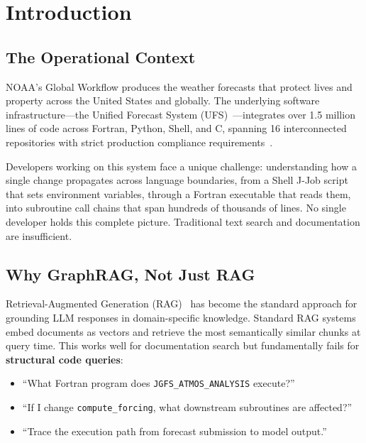 \documentclass[11pt,letterpaper]{article}
\begin{document}
\tableofcontents
\newpage

\section{Introduction}
\label{sec:intro}

\subsection{The Operational Context}

NOAA's Global Workflow produces the weather forecasts that protect lives
and property across the United States and globally. The underlying
software infrastructure---the Unified Forecast System
(UFS)~\cite{ufs2024}---integrates over 1.5 million lines of code across
Fortran, Python, Shell, and C, spanning 16 interconnected repositories
with strict production compliance
requirements~\cite{noaa2025ee2,globalworkflow2025}.

Developers working on this system face a unique challenge: understanding
how a single change propagates across language boundaries, from a Shell
J-Job script that sets environment variables, through a Fortran executable
that reads them, into subroutine call chains that span hundreds of
thousands of lines. No single developer holds this complete picture.
Traditional text search and documentation are insufficient.

\subsection{Why GraphRAG, Not Just RAG}

Retrieval-Augmented Generation (RAG)~\cite{lewis2020rag} has become the
standard approach for grounding LLM responses in domain-specific
knowledge. Standard RAG systems embed documents as vectors and retrieve
the most semantically similar chunks at query time. This works well for
documentation search but fundamentally fails for \textbf{structural code
queries}:

\begin{itemize}[nosep]
    \item ``What Fortran program does \texttt{JGFS\_ATMOS\_ANALYSIS} execute?''
    \item ``If I change \texttt{compute\_forcing}, what downstream subroutines are affected?''
    \item ``Trace the execution path from forecast submission to model output.''
\end{itemize}
\end{document}
